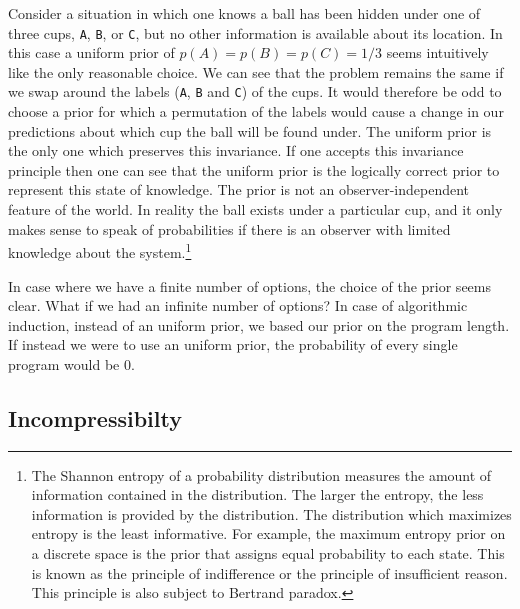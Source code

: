 \documentclass[oneside,hidelinks]{article}
\begin{document}
Consider a situation in which one knows a ball has been hidden under one of three cups, \texttt{A}, \texttt{B}, or \texttt{C}, but no other information is available about its location.
In this case a uniform prior of $p(A) = p(B) = p(C) = 1/3$ seems intuitively like the only reasonable choice.
We can see that the problem remains the same if we swap around the labels (\texttt{A}, \texttt{B} and \texttt{C}) of the cups.
It would therefore be odd to choose a prior for which a permutation of the labels would cause a change in our predictions about which cup the ball will be found under.
The uniform prior is the only one which preserves this invariance.
If one accepts this invariance principle then one can see that the uniform prior is the logically correct prior to represent this state of knowledge.
The prior is not an observer-independent feature of the world.
In reality the ball exists under a particular cup, and it only makes sense to speak of probabilities if there is an observer with limited knowledge about the system.\footnote{
The Shannon entropy of a probability distribution measures the amount of information contained in the distribution.
The larger the entropy, the less information is provided by the distribution.
The distribution which maximizes entropy is the least informative.
For example, the maximum entropy prior on a discrete space is the prior that assigns equal probability to each state.
This is known as the principle of indifference or the principle of insufficient reason.
This principle is also subject to Bertrand paradox.
}

In case where we have a finite number of options, the choice of the prior seems clear.
What if we had an infinite number of options?
In case of algorithmic induction, instead of an uniform prior, we based our prior on the program length.
If instead we were to use an uniform prior, the probability of every single program would be 0.

\newpage

\subsection{Incompressibilty}
\end{document}
